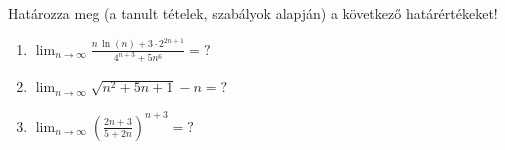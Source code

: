 \documentclass[11pt]{scrartcl}
\begin{document}
Határozza meg (a tanult tételek, szabályok alapján) a következő határértékeket!
\begin{enumerate}
	\item \(\displaystyle
	      \lim_{n \to \infty} \frac{
		      n \, \ln(n) + 3 \cdot 2^{2n + 1}
	      }{
		      4^{n + 3} + 5 n^6
	      } = ?
	      \)

	\item \(\displaystyle
	      \lim_{n \to \infty} \sqrt{n^2 + 5n + 1} - n = ?
	      \)

	\item \(\displaystyle
	      \lim_{n \to \infty} \left(
	      \frac{2n + 3}{5 + 2n}
	      \right)^{n + 3} = ?
	      \)
\end{enumerate}
\end{document}
